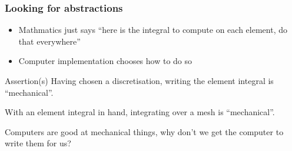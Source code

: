 \documentclass[presentation]{beamer}
\begin{document}
\begin{frame}
  \frametitle{Looking for abstractions}
  \begin{itemize}
  \item Mathmatics just says ``here is the integral to compute on each
    element, do that everywhere''
  \item Computer implementation chooses how to do so
  \end{itemize}
  \begin{block}{Assertion(s)}
    Having chosen a discretisation, writing the element integral is ``mechanical''.

    With an element integral in hand, integrating over a mesh is
    ``mechanical''.
  \end{block}

  \begin{corollary}
    Computers are good at mechanical things, why don't we get the
    computer to write them for us?
  \end{corollary}
\end{frame}
\end{document}
